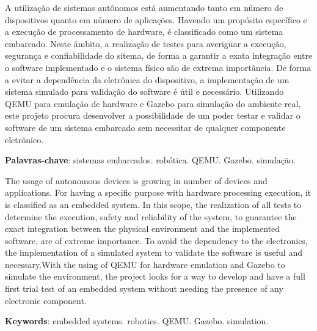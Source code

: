 \documentclass[../monografia.tex]{subfiles}
\begin{document}
    \clearpage

    {\centering   
    }
     A utilização de sistemas autônomos está aumentando tanto em número de dispositivos quanto em número de aplicações. Havendo um propósito específico e a execução de processamento de hardware, é classificado como um sistema embarcado. Neste âmbito, a realização de testes para averiguar a execução, segurança e confiabilidade do sitema, de forma a garantir a exata integração entre o software implementado  e o sistema físico são de extrema importância. De forma a evitar a dependência da eletrônica do dispositivo, a implementação de um sistema simulado para validação do software é útil e necessário. Utilizando QEMU para emulação de hardware e Gazebo para simulação do ambiente real, este projeto procura desenvolver a possibilidade de um poder testar e validar o software de um sistema embarcado sem necessitar de qualquer componente eletrõnico.
    
     \textbf{Palavras-chave}: sistemas embarcados. robótica. QEMU. Gazebo. simulação.
        
    \clearpage
    
    {\centering   
    }
    \hspace{1cm} The usage of autonomous devices is growing in number of devices and applications. For having a specific purpose with hardware processing execution, it is classified as an embedded system. In this scope, the realization of all tests to determine the execution, safety and reliability of the system, to guarantee the exact integration between the physical environment  and the implemented software, are of extreme importance. To avoid the dependency to the electronics, the implementation of a simulated system to validate the software is useful and necessary.With the using of QEMU for hardware emulation and Gazebo to simulate the environment, the project looks for a way to develop and have a full first trial test of an embedded system without needing the presence of any electronic component.

   \vspace{\onelineskip}
 
   \noindent 
   \textbf{Keywords}: embedded systems. robotics. QEMU. Gazebo. simulation.
\end{document}
